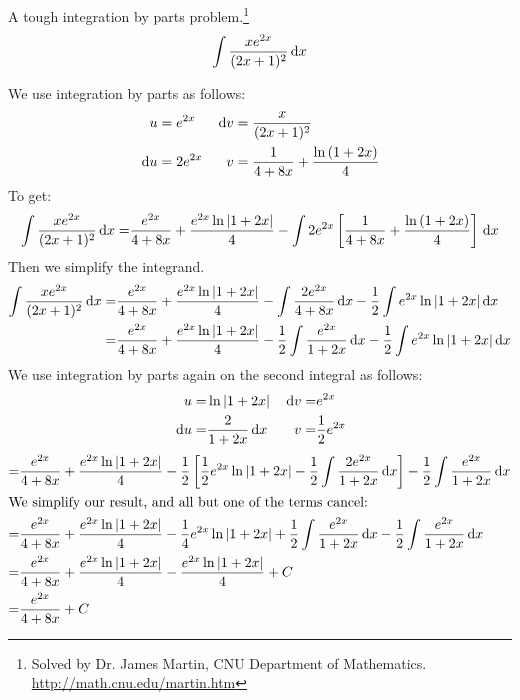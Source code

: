 \begin{ex} A tough integration by parts problem.\footnote{Solved by Dr. James Martin, CNU Department of Mathematics. \url{http://math.cnu.edu/martin.htm}}
	\[ \int \frac{xe^{2x}}{(2x+1)^2}\,\mathrm{d} x \]
  \begin{sol}
      We use integration by parts as follows:
      \begin{align*}
        u&=e^{2x} & \,\mathrm{d} v&=\frac{x}{(2x+1)^2} \\
        \,\mathrm{d} u &= 2e^{2x} & v &=\frac{1}{4+8x}+\frac{\ln{(1+2x)}}{4}
      \end{align*}
      To get:
      \begin{align*}
        \int \frac{xe^{2x}}{(2x+1)^2}\,\mathrm{d} x
        =& \frac{e^{2x}}{4+8x}+\frac{e^{2x}\ln{|1+2x|}}{4}-\int 2e^{2x}\left[\frac{1}{4+8x}+\frac{\ln{(1+2x)}}{4}\right]\,\mathrm{d} x \\
      \end{align*}
      Then we simplify the integrand.
      \begin{align*}
        \int \frac{xe^{2x}}{(2x+1)^2}\,\mathrm{d} x =& \frac{e^{2x}}{4+8x}+\frac{e^{2x}\ln{|1+2x|}}{4}-\int \frac{2e^{2x}}{4+8x}\,\mathrm{d} x-\frac{1}{2} \int e^{2x}\ln{|1+2x|}\,\mathrm{d} x \\
        =& \frac{e^{2x}}{4+8x}+\frac{e^{2x}\ln{|1+2x|}}{4}-\frac{1}{2}\int \frac{e^{2x}}{1+2x}\,\mathrm{d} x-\frac{1}{2} \int e^{2x}\ln{|1+2x|}\,\mathrm{d} x
      \end{align*}
      We use integration by parts again on the second integral as follows:
      \begin{align*}
        u=&\ln{|1+2x|} & \,\mathrm{d} v=&e^{2x} \\
        \,\mathrm{d} u=&\frac{2}{1+2x}\,\mathrm{d} x & v=& \frac{1}{2}e^{2x}
      \end{align*}
      \begin{align*}
        =& \frac{e^{2x}}{4+8x}+\frac{e^{2x}\ln{|1+2x|}}{4}
        -\frac{1}{2}\left[\frac{1}{2}e^{2x}\ln{|1+2x|}
          -\frac{1}{2} \int \frac{2e^{2x}}{1+2x} \,\mathrm{d} x\right]
          -\frac{1}{2}\int \frac{e^{2x}}{1+2x}\,\mathrm{d} x \\
          \intertext{We simplify our result, and all but one of the terms cancel:}
          =& \frac{e^{2x}}{4+8x}+\frac{e^{2x}\ln{|1+2x|}}{4}
          -\frac{1}{4}e^{2x}\ln{|1+2x|}
          + \frac{1}{2} \int \frac{e^{2x}}{1+2x} \,\mathrm{d} x
          -\frac{1}{2}\int \frac{e^{2x}}{1+2x}\,\mathrm{d} x \\
          =& \frac{e^{2x}}{4+8x}+\frac{e^{2x}\ln{|1+2x|}}{4}
          -\frac{e^{2x}\ln{|1+2x|}}{4}+C \\
          =& \frac{e^{2x}}{4+8x}+C
        \end{align*}
\end{sol}
\end{ex}
